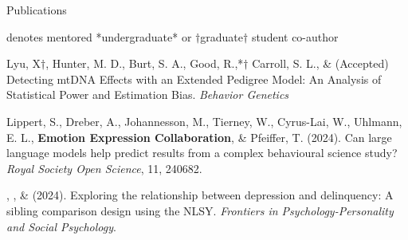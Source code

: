 \begin{rSection}{\textrm{Publications}}%
\vspace{-1mm}\begin{center}\footnotesize{denotes mentored *undergraduate* or $\dagger$graduate$\dagger$ student co-author}\end{center}\vspace{-1mm}
\begin{etaremune}

\item Lyu, X$\dagger$, Hunter, M. D., Burt, S. A., Good, R.,*$\dagger$ Carroll, S. L., \& \meb (Accepted) Detecting mtDNA Effects with an Extended Pedigree Model: An Analysis of Statistical Power and Estimation Bias. \href{https://www.biorxiv.org/content/10.1101/2024.12.19.629449v1}{\small\color{blue}{biorxiv.org/content/10.1101/2024.12.19.629449v1}} 
\textit{Behavior Genetics}

\item Lippert, S., Dreber, A., Johannesson, M., Tierney, W., Cyrus-Lai, W., Uhlmann, E. L., \textbf{Emotion Expression Collaboration}, \& Pfeiffer, T. (2024). Can large language models help predict results from a complex behavioural science study? \textit{Royal Society Open Science}, 11, 240682. 

\item \emsims, \jt, \& \meb (2024). Exploring the relationship between depression and delinquency: A sibling comparison design using the NLSY.  \textit{Frontiers in Psychology-Personality and Social Psychology}. 


\end{etaremune}
\end{rSection}
